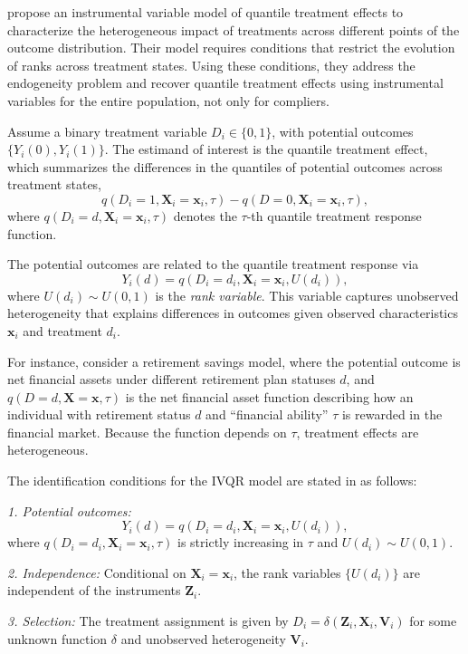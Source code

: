 \cite{Chernozhukov2005} propose an instrumental variable model of quantile treatment effects to characterize the heterogeneous impact of treatments across different points of the outcome distribution. Their model requires conditions that restrict the evolution of ranks across treatment states. Using these conditions, they address the endogeneity problem and recover quantile treatment effects using instrumental variables for the entire population, not only for compliers.  

Assume a binary treatment variable $D_i\in\{0,1\}$, with potential outcomes $\{Y_i(0),Y_i(1)\}$. The estimand of interest is the quantile treatment effect, which summarizes the differences in the quantiles of potential outcomes across treatment states,
\[
q(D_i=1,\mathbf{X}_i=\mathbf{x}_i,\tau)-q(D=0,\mathbf{X}_i=\mathbf{x}_i,\tau),
\] 
where $q(D_i=d,\mathbf{X}_i=\mathbf{x}_i,\tau)$ denotes the $\tau$-th quantile treatment response function.  

The potential outcomes are related to the quantile treatment response via
\[
Y_i(d)=q(D_i=d_i,\mathbf{X}_i=\mathbf{x}_i,U(d_i)),
\]
where $U(d_i)\sim U(0,1)$ is the \textit{rank variable}. This variable captures unobserved heterogeneity that explains differences in outcomes given observed characteristics $\mathbf{x}_i$ and treatment $d_i$.  

For instance, consider a retirement savings model, where the potential outcome is net financial assets under different retirement plan statuses $d$, and $q(D=d,\mathbf{X}=\mathbf{x},\tau)$ is the net financial asset function describing how an individual with retirement status $d$ and ``financial ability'' $\tau$ is rewarded in the financial market. Because the function depends on $\tau$, treatment effects are heterogeneous.  

The identification conditions for the IVQR model are stated in \cite{Chernozhukov2005} as follows:

\textit{1. Potential outcomes:}  
\[
Y_i(d)=q(D_i=d_i,\mathbf{X}_i=\mathbf{x}_i,U(d_i)),
\]
where $q(D_i=d_i,\mathbf{X}_i=\mathbf{x}_i,\tau)$ is strictly increasing in $\tau$ and $U(d_i)\sim U(0,1)$.  

\textit{2. Independence:} Conditional on $\mathbf{X}_i=\mathbf{x}_i$, the rank variables $\{U(d_i)\}$ are independent of the instruments $\mathbf{Z}_i$.  

\textit{3. Selection:} The treatment assignment is given by $D_i=\delta(\mathbf{Z}_i,\mathbf{X}_i,\mathbf{V}_i)$ for some unknown function $\delta$ and unobserved heterogeneity $\mathbf{V}_i$.  

